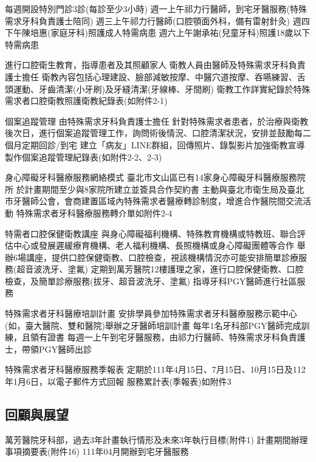 \begin{outline}
\1 每週開設特別門診3診(每診至少3小時)
    \2 週一上午祁力行醫師，到宅牙醫服務(特殊需求牙科負責護士陪同)
    \2 週三上午祁力行醫師(口腔顎面外科，備有雷射針灸)
    \2 週四下午陳培惠(家庭牙科)照護成人特需病患
    \2 週六上午謝承祐(兒童牙科)照護18歲以下特需病患
    
\1 進行口腔衛生教育，指導患者及其照顧家人
    \2 衛教人員由醫師及特殊需求牙科負責護士擔任
    \2 衛教內容包括心理建設、臉部減敏按摩、中醫穴道按摩、吞嚥練習、舌頭運動、牙齒清潔(小牙刷)及牙縫清潔(牙線棒、牙間刷)
    \2 衛教工作詳實紀錄於特殊需求者口腔衛教照護衛教紀錄表(如附件2-1)
    
\1 個案追蹤管理
    \2 由特殊需求牙科負責護士擔任
    \2 針對特殊需求者患者，於治療與衛教後次日，進行個案追蹤管理工作，詢問術後情況、口腔清潔狀況，安排並鼓勵每二個月定期回診/到宅
    \2 建立「病友」LINE群組，回傳照片、錄製影片加強衛教宣導
    \2 製作個案追蹤管理紀錄表(如附件2-2、2-3)

\1 身心障礙牙科醫療服務網絡模式
    \2 臺北市文山區已有14家身心障礙牙科醫療服務院所
    \2 於計畫期間至少與8家院所建立並簽具合作契約書
    \2 主動與臺北市衛生局及臺北市牙醫師公會，會商建置區域內特殊需求者醫療轉診制度，增進合作醫院間交流活動
    \2 特殊需求者牙科醫療服務轉介單如附件2-4

\1 特需者口腔保健衛教講座
    \2 與身心障礙福利機構、特殊教育機構或特教班、聯合評估中心或發展遲緩療育機構、老人福利機構、長照機構或身心障礙團體等合作
    \2 舉辦6場講座，提供口腔保健衛教、口腔檢查，視該機構情況亦可能安排簡單診療服務(超音波洗牙、塗氟)
    \2 定期到萬芳醫院12樓護理之家，進行口腔保健衛教、口腔檢查，及簡單診療服務(拔牙、超音波洗牙、塗氟)
    \2 指導牙科PGY醫師進行社區服務
    
\1 特殊需求者牙科醫療培訓計畫
    \2 安排學員參加特殊需求者牙科醫療服務示範中心(如，臺大醫院、雙和醫院)舉辦之牙醫師培訓計畫
    \2 每年1名牙科部PGY醫師完成訓練，且領有證書
    \2 每週一上午到宅牙醫服務，由祁力行醫師、特殊需求牙科負責護士，帶領PGY醫師出診
    
\1 特殊需求者牙科醫療服務季報表
    \2 定期於111年4月15日、7月15日、10月15日及112年1月6日，以電子郵件方式回報
    \2 服務累計表(季報表)如附件3


\end{outline}

\subsection{回顧與展望}
\begin{outline}
\1 萬芳醫院牙科部，過去3年計畫執行情形及未來3年執行目標(附件1)
\1 計畫期間辦理事項摘要表(附件16)
\1 111年04月開辦到宅牙醫服務
\end{outline}

